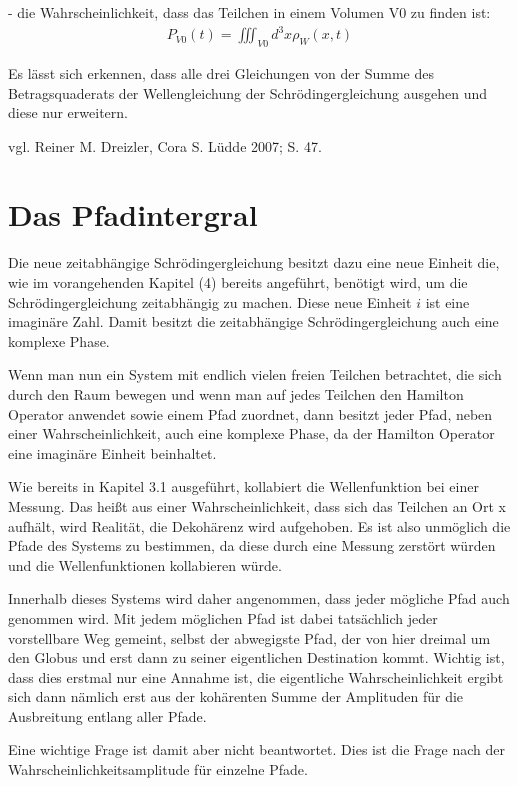 \documentclass[12pt,oneside, a4paper]{scrbook}
\begin{document}
- die Wahrscheinlichkeit, dass das Teilchen in einem Volumen V0 zu finden ist:
\begin{align}
  P_{V0} (t) = \iiint_{V0} d^{3}x \rho_{W} (x, t)
\end{align}

Es lässt sich erkennen, dass alle drei Gleichungen von der Summe des Betragsquaderats der Wellengleichung der Schrödingergleichung ausgehen und diese nur erweitern.

vgl. Reiner M. Dreizler, Cora S. Lüdde 2007; S. 47.

\section{Das Pfadintergral}

Die neue zeitabhängige Schrödingergleichung besitzt dazu eine neue Einheit die, wie im vorangehenden Kapitel (4) bereits angeführt, benötigt wird, um die Schrödingergleichung zeitabhängig zu machen. Diese neue Einheit ${i}$ ist eine imaginäre Zahl. Damit besitzt die zeitabhängige Schrödingergleichung auch eine komplexe Phase.

Wenn man nun ein System mit endlich vielen freien Teilchen betrachtet, die sich durch den Raum bewegen und wenn man auf jedes Teilchen den Hamilton Operator anwendet sowie einem Pfad zuordnet, dann besitzt jeder Pfad, neben einer Wahrscheinlichkeit, auch eine komplexe Phase, da der Hamilton Operator eine imaginäre Einheit beinhaltet.

Wie bereits in Kapitel 3.1 ausgeführt, kollabiert die Wellenfunktion bei einer Messung. Das heißt aus einer Wahrscheinlichkeit, dass sich das Teilchen an Ort x aufhält, wird Realität, die Dekohärenz wird aufgehoben. Es ist also unmöglich die Pfade des Systems zu bestimmen, da diese durch eine Messung zerstört würden und die Wellenfunktionen kollabieren würde.

Innerhalb dieses Systems wird daher angenommen, dass jeder mögliche Pfad auch genommen wird. Mit jedem möglichen Pfad ist dabei tatsächlich jeder vorstellbare Weg gemeint, selbst der abwegigste Pfad, der von hier dreimal um den Globus und erst dann zu seiner eigentlichen Destination kommt. Wichtig ist, dass dies erstmal nur eine Annahme ist, die eigentliche Wahrscheinlichkeit ergibt sich dann nämlich erst aus der kohärenten Summe der Amplituden für die Ausbreitung entlang aller Pfade.

Eine wichtige Frage ist damit aber nicht beantwortet. Dies ist die Frage nach der Wahrscheinlichkeitsamplitude für einzelne Pfade. 
\end{document}
